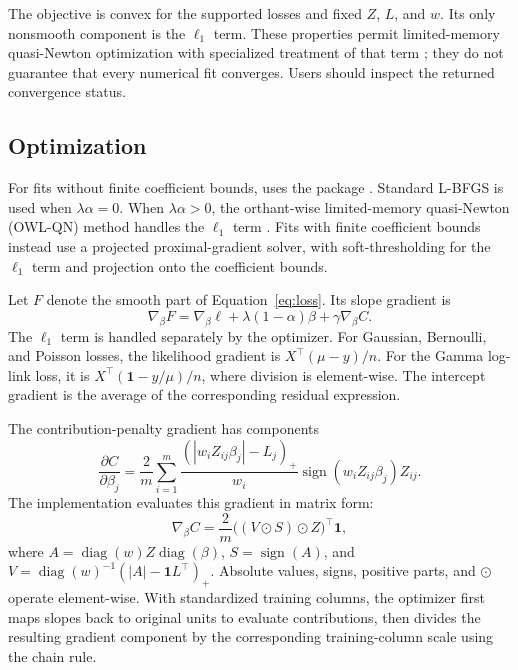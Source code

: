 \documentclass[article,shortnames,nofooter]{jss}
\begin{document}
The objective is convex for the supported losses and fixed $Z$, $L$, and $w$. Its only nonsmooth component is the $\ell_1$ term. These properties permit limited-memory quasi-Newton optimization with specialized treatment of that term \citep{nocedal1980,andrew2007}; they do not guarantee that every numerical fit converges. Users should inspect the returned convergence status.

\subsection{Optimization}

For fits without finite coefficient bounds,  uses the  package \citep{lbfgs}. Standard L-BFGS is used when $\lambda\alpha=0$. When $\lambda\alpha>0$, the orthant-wise limited-memory quasi-Newton (OWL-QN) method handles the $\ell_1$ term \citep{andrew2007}. Fits with finite coefficient bounds instead use a projected proximal-gradient solver, with soft-thresholding for the $\ell_1$ term and projection onto the coefficient bounds.

Let $F$ denote the smooth part of Equation~\ref{eq:loss}. Its slope gradient is
\begin{equation}
\nabla_\beta F=\nabla_\beta\ell+\lambda(1-\alpha)\beta
+\gamma\nabla_\beta C.
\label{eq:gradient}
\end{equation}
The $\ell_1$ term is handled separately by the optimizer. For Gaussian, Bernoulli, and Poisson losses, the likelihood gradient is $X^\top(\mu-y)/n$. For the Gamma log-link loss, it is $X^\top(\bm{1}-y/\mu)/n$, where division is element-wise. The intercept gradient is the average of the corresponding residual expression.

The contribution-penalty gradient has components
\begin{equation}
\frac{\partial C}{\partial\beta_j}
=\frac{2}{m}\sum_{i=1}^m
\frac{(|w_iZ_{ij}\beta_j|-L_j)_+}{w_i}
\operatorname{sign}(w_iZ_{ij}\beta_j)Z_{ij}.
\label{eq:cap-gradient}
\end{equation}
The implementation evaluates this gradient in matrix form:
\begin{equation}
\nabla_\beta C=\frac{2}{m}\big((V\odot S)\odot Z\big)^\top\bm{1},
\label{eq:matrix-gradient}
\end{equation}
where $A=\operatorname{diag}(w)Z\operatorname{diag}(\beta)$,
$S=\operatorname{sign}(A)$, and
$V=\operatorname{diag}(w)^{-1}(|A|-\bm{1}L^\top)_+$.
Absolute values, signs, positive parts, and $\odot$ operate element-wise. With standardized training columns, the optimizer first maps slopes back to original units to evaluate contributions, then divides the resulting gradient component by the corresponding training-column scale using the chain rule.
\end{document}
